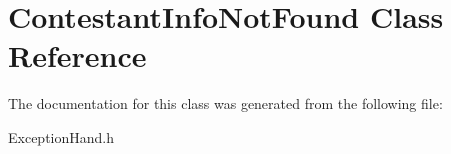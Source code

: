 \hypertarget{class_contestant_info_not_found}{}\section{Contestant\+Info\+Not\+Found Class Reference}
\label{class_contestant_info_not_found}


The documentation for this class was generated from the following file\+:\begin{DoxyCompactItemize}
\item 
Exception\+Hand.\+h\end{DoxyCompactItemize}
